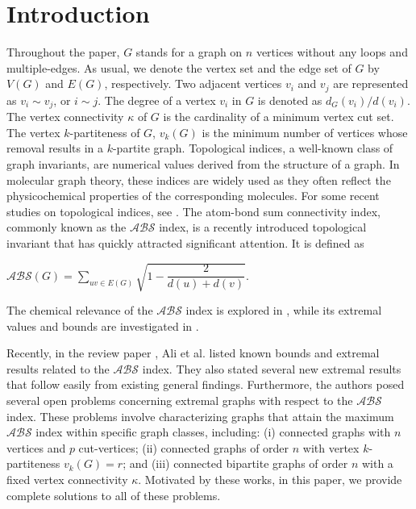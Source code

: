 \documentclass[12pt]{article}
\begin{document}
        \section{Introduction}
        Throughout the paper, $G$ stands for a graph on $n$ vertices without any loops and multiple-edges. As usual, we denote the vertex set and the edge set of $G$ by $V(G)$ and $E(G)$, respectively. Two adjacent vertices $v_{i}$ and $v_{j}$ are represented as $v_{i}\sim v_{j}$, or $i\sim j$. The degree of a vertex $v_i$ in $G$ is denoted as $d_G(v_i)/ d(v_i).$ The vertex connectivity $\kappa$ of $G$ is the cardinality of a minimum vertex cut set. The vertex $k$-partiteness  of $G$, $v_{k}(G)$ is the minimum number of vertices whose removal results in a $k$-partite graph.   Topological indices, a well-known class of graph invariants, are numerical values derived from the structure of a graph. In molecular graph theory, these indices are widely used as they often reflect the physicochemical properties of the corresponding molecules. For some recent studies on topological indices, see \cite{das2025vertex,gao2025extremal}.  The atom-bond sum connectivity index, commonly known as the $\mathcal{ABS}$ index, is a recently introduced topological invariant that has quickly attracted significant attention. It is defined as  \begin{center}$\mathcal{ABS}(G)=\sum\limits_{uv\in E(G)} \sqrt{1-\dfrac{2}{d(u)+d(v)}}$.\end{center} The chemical relevance of the $\mathcal{ABS}$ index is explored in \cite{ali2023atom}, while its extremal values and bounds are investigated in \cite{li2024greatest,nithya2023smallest}. 

Recently, in the review paper \cite{ali2024extremal}, Ali et al. listed known bounds and extremal results related to the $\mathcal{ABS}$ index. They also stated several new extremal results that follow easily from existing general findings. Furthermore, the authors posed several open problems concerning extremal graphs with respect to the $\mathcal{ABS}$ index. These problems involve characterizing graphs that attain the maximum $\mathcal{ABS}$ index within specific graph classes, including: (i) connected graphs with \( n \) vertices and \( p \) cut-vertices; (ii) connected graphs of order \( n \) with vertex $k$-partiteness \( v_k(G) = r \); and (iii) connected bipartite graphs of order \( n \) with a fixed vertex connectivity \( \kappa \). Motivated by these works, in this paper, we provide complete solutions to all of these problems.
\end{document}

